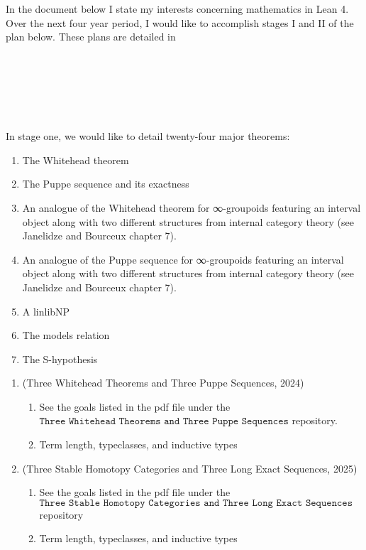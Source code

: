 \documentclass{book}
\newcounter{pcounter}
\newcounter{sectioncount}
\newcounter{subsectioncount}
\renewcommand{\section}[1]{\newpage\ \\ \ \\ \begin{center} \scalebox{1.5}{\texttt{\thesectioncount . #1}} \stepcounter{sectioncount} \setcounter{subsectioncount}{1} \end{center} \begin{center} \ \\ \ \\ \thispagestyle{empty} \end{center}}
\begin{document}
In the document below I state my interests concerning mathematics in Lean 4. Over the next four year period, I would like to accomplish stages I and II of the plan below. These plans are detailed in 

\section{\scalebox{0.6}{Stage I: twenty-four goals concerning homotopy and stable homotopy}}

In stage one, we would like to detail twenty-four major theorems:

\begin{enumerate}
\item The Whitehead theorem
\item The Puppe sequence and its exactness
\item An analogue of the Whitehead theorem for ∞-groupoids featuring an interval object along with two different structures from internal category theory (see Janelidze and Bourceux chapter 7).
\item An analogue of the Puppe sequence for ∞-groupoids featuring an interval object along with two different structures from internal category theory (see Janelidze and Bourceux chapter 7).
\item A linlibNP 
\item The models relation 
\item The S-hypothesis
\end{enumerate}

\begin{enumerate}
\item (Three Whitehead Theorems and Three Puppe Sequences, 2024)
\begin{enumerate}
\item See the goals listed in the pdf file under the $\texttt{Three Whitehead Theorems and Three Puppe Sequences}$ repository.
\item Term length, typeclasses, and inductive types
\end{enumerate}
\item (Three Stable Homotopy Categories and Three Long Exact Sequences, 2025)
\begin{enumerate}
\item See the goals listed in the pdf file under the $\texttt{Three Stable Homotopy Categories and Three Long Exact Sequences}$ repository 
\item Term length, typeclasses, and inductive types
\end{enumerate}
\end{enumerate}
\end{document}
